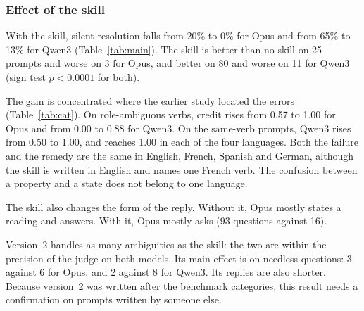 \documentclass[11pt,a4paper]{article}
\begin{document}
\subsubsection{Effect of the skill}

With the skill, silent resolution falls from 20\% to 0\% for Opus and from
65\% to 13\% for Qwen3 (Table~\ref{tab:main}). The skill is better than no
skill on 25 prompts and worse on 3 for Opus, and better on 80 and worse on
11 for Qwen3 (sign test $p<0.0001$ for both).

The gain is concentrated where the earlier study located the errors
(Table~\ref{tab:cat}). On role-ambiguous verbs, credit rises from 0.57 to
1.00 for Opus and from 0.00 to 0.88 for Qwen3. On the same-verb prompts,
Qwen3 rises from 0.50 to 1.00, and reaches 1.00 in each of the four
languages. Both the failure and the remedy are the same in English,
French, Spanish and German, although the skill is written in English and
names one French verb. The confusion between a property and a state does
not belong to one language.

The skill also changes the form of the reply. Without it, Opus mostly
states a reading and answers. With it, Opus mostly asks (93 questions
against 16).

Version~2 handles as many ambiguities as the skill: the two are within
the precision of the judge on both models. Its main effect is on needless
questions: 3 against 6 for Opus, and 2 against 8 for Qwen3. Its replies
are also shorter. Because version~2 was written after the benchmark categories, this
result needs a confirmation on prompts written by someone else.
\end{document}
